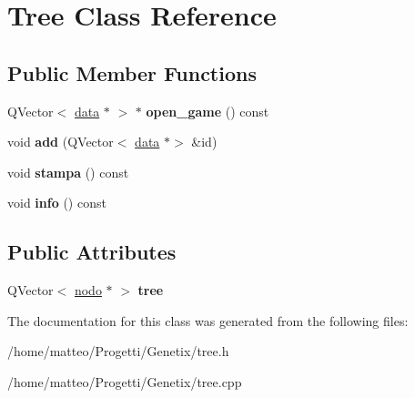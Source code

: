 \hypertarget{classTree}{}\section{Tree Class Reference}
\label{classTree}
\subsection*{Public Member Functions}
\begin{DoxyCompactItemize}
\item 
\mbox{\label{classTree_aa1849ce447f706f9a3e733c67513eeb6}} 
Q\+Vector$<$ \hyperlink{structdata}{data} $\ast$ $>$ $\ast$ {\bfseries open\+\_\+game} () const
\item 
\mbox{\label{classTree_a16bca1b8913f904c4ca7f2cdcb219e89}} 
void {\bfseries add} (Q\+Vector$<$ \hyperlink{structdata}{data} $\ast$$>$ \&id)
\item 
\mbox{\label{classTree_acaeebec45f26c71162940ddb8664cce2}} 
void {\bfseries stampa} () const
\item 
\mbox{\label{classTree_a203bc7efa4b5a803e306ace63c19384f}} 
void {\bfseries info} () const
\end{DoxyCompactItemize}
\subsection*{Public Attributes}
\begin{DoxyCompactItemize}
\item 
\mbox{\label{classTree_ae817b42499ec155414dfeb3d6dcda749}} 
Q\+Vector$<$ \hyperlink{structnodo}{nodo} $\ast$ $>$ {\bfseries tree}
\end{DoxyCompactItemize}


The documentation for this class was generated from the following files\+:\begin{DoxyCompactItemize}
\item 
/home/matteo/\+Progetti/\+Genetix/tree.\+h\item 
/home/matteo/\+Progetti/\+Genetix/tree.\+cpp\end{DoxyCompactItemize}
